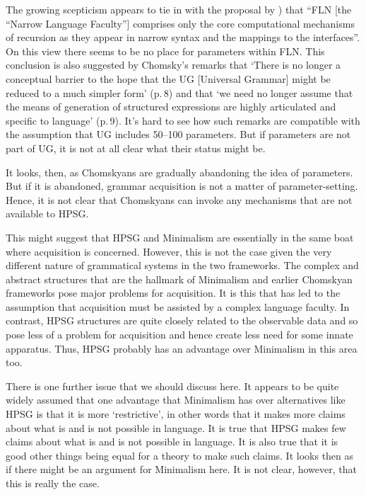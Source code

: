\documentclass[output=paper]{langsci/langscibook}
\begin{document}
The growing scepticism appears to tie in with the proposal by \citet*[]{HCF2002a})
that ``FLN [the ``Narrow Language Faculty''] comprises only the core computational mechanisms of
recursion as they appear in narrow syntax and the mappings to the interfaces''. On this view there
seems to be no place for parameters within FLN. This conclusion is also suggested by Chomsky’s
remarks \citeyearpar{Chomsky2005a} that ‘There is no longer a conceptual barrier to the hope that the UG [Universal
  Grammar] might be reduced to a much simpler form’ (p.\,8) and that ‘we need no longer assume that
the means of generation of structured expressions are highly articulated and specific to language’
(p.\,9). It’s hard to see how such remarks are compatible with the assumption that UG includes 50--100
parameters. But if parameters are not part of UG, it is not at all clear what their status might be.

It looks, then, as Chomskyans are gradually abandoning the idea of parameters. But if it is
abandoned, grammar acquisition is not a matter of parameter-setting. Hence, it is not clear that
Chomskyans can invoke any mechanisms that are not available to HPSG.

This might suggest that HPSG and Minimalism are essentially in the same boat where acquisition is
concerned. However, this is not the case given the very different nature of grammatical systems in
the two frameworks. The complex and abstract structures that are the hallmark of Minimalism and
earlier Chomskyan frameworks pose major problems for acquisition. It is this that has led to the
assumption that acquisition must be assisted by a complex language faculty. In contrast, HPSG
structures are quite closely related to the observable data and so pose less of a problem for
acquisition and hence create less need for some innate apparatus. Thus, HPSG probably has an
advantage over Minimalism in this area too.

There is one further issue that we should discuss here. It appears to be quite widely assumed that
one advantage that Minimalism has over alternatives like HPSG is that it is more ‘restrictive’, in
other words that it makes more claims about what is and is not possible in language. It is true that
HPSG makes few claims about what is and is not possible in language. It is also true that it is good
other things being equal for a theory to make such claims. It looks then as if there might be an
argument for Minimalism here. It is not clear, however, that this is really the case.
\end{document}
